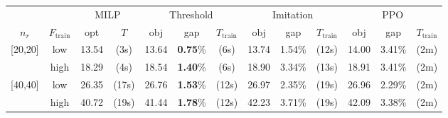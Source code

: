 \begin{tabular}{cc|cc|ccc|ccc|ccc}
& & \multicolumn{2}{c|}{MILP} & \multicolumn{3}{c|}{Threshold} & \multicolumn{3}{c|}{Imitation} & \multicolumn{3}{c}{PPO} \\
$n_r$ & $F_\text{train}$ & opt & $T$ & obj & gap & $T_\text{train}$ & obj & gap & $T_\text{train}$ & obj & gap & $T_\text{train}$ \\
%
%
\midrule
\multirow[t]{2}{*}{[20,20]} & low & 13.54 & (3s) & 13.64 & \textbf{0.75}\% & (6s) & 13.74 & 1.54\% & (12s) & 14.00 & 3.41\% & (2m) \\
 & high & 18.29 & (4s) & 18.54 & \textbf{1.40}\% & (6s) & 18.90 & 3.34\% & (13s) & 18.91 & 3.41\% & (2m) \\
\multirow[t]{2}{*}{[40,40]} & low & 26.35 & (17s) & 26.76 & \textbf{1.53}\% & (12s) & 26.97 & 2.35\% & (19s) & 26.96 & 2.29\% & (2m) \\
 & high & 40.72 & (19s) & 41.44 & \textbf{1.78}\% & (12s) & 42.23 & 3.71\% & (19s) & 42.09 & 3.38\% & (2m) \\

\end{tabular}
